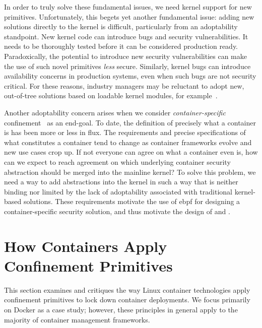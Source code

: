 \begin{enumerate}[font=\bfseries]
    In order to truly solve these fundamental issues, we need kernel support for new
    primitives. Unfortunately, this begets yet another fundamental issue: adding new
    solutions directly to the kernel is difficult, particularly from an adoptability
    standpoint. New kernel code can introduce bugs and security vulnerabilities. It needs
    to be thoroughly tested before it can be considered production ready. Paradoxically,
    the potential to introduce new security vulnerabilities can make the use of such novel
    primitives \textit{less} secure. Similarly, kernel bugs can introduce availability
    concerns in production systems, even when such bugs are not security critical. For
    these reasons, industry managers may be reluctant to adopt new, out-of-tree solutions
    based on loadable kernel modules, for example~\cite{gregg2019_bpf}.

    Another adoptability concern arises when we consider \textit{container-specific}
    confinement~\cite{sultan2019_container_security, sun2018_security_namespace} as an
    end-goal.  To date, the definition of precisely what a container is has been more or
    less in flux. The requirements and precise specifications of what constitutes
    a container tend to change as container frameworks evolve and new use cases crop up.
    If not everyone can agree on what a container even is, how can we expect to reach
    agreement on which underlying container security abstraction should be merged into the
    mainline kernel? To solve this problem, we need a way to add abstractions into the
    kernel in such a way that is neither binding nor limited by the lack of adoptability
    associated with traditional kernel-based solutions. These requirements motivate the
    use of \gls{ebpf} for designing a container-specific security solution, and thus
    motivate the design of \bpfbox{} and \bpfcontain{}.
\end{enumerate}



\section{How Containers Apply Confinement Primitives}%
\label{s:cp-containers}

This section examines and critiques the way Linux container technologies apply confinement
primitives to lock down container deployments. We focus primarily on Docker as a case
study; however, these principles in general apply to the majority of container management
frameworks.

